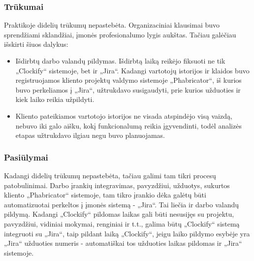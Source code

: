 \subsubsection{Trūkumai}
Praktikoje didelių trūkumų nepastebėta. Organizaciniai klausimai buvo sprendžiami sklandžiai, įmonės profesionalumo lygis aukštas. Tačiau galėčiau išskirti šiuos dalykus:

\begin{itemize}
    \item Išdirbtų darbo valandų pildymas. Išdirbtą laiką reikėjo fiksuoti ne tik „Clockify“ sistemoje, bet ir „Jira“. Kadangi vartotojų istorijos ir klaidos buvo registruojamos
    kliento projektų valdymo sistemoje „Phabricator“, iš kurios buvo perkeliamos į „Jira“, užtrukdavo susigaudyti, prie kurios užduoties ir kiek laiko reikia užpildyti.
    \item Kliento pateikiamos vartotojo istorijos ne visada atspindėjo visą vaizdą, nebuvo iki galo aišku, kokį funkcionalumą reikia įgyvendinti, todėl analizės etapas užtrukdavo ilgiau
    negu buvo planuojamas.
\end{itemize}


\subsubsection{Pasiūlymai}
Kadangi didelių trūkumų nepastebėta, tačiau galimi tam tikri procesų patobulinimai. Darbo įrankių integravimas, pavyzdžiui, užduotys, sukurtos kliento „Phabricator“ sistemoje,
tam tikro įrankio dėka galėtų būti automatizuotai perkeltos į įmonės sistemą - „Jira“. Tai liečia ir darbo valandų pildymą. Kadangi „Clockify“ pildomas laikas
gali būti nesusijęs su projektu, pavyzdžiui, vidiniai mokymai, renginiai ir t.t., galima būtų „Clockify“ sistemą integruoti su „Jira“, taip pildant laiką „Clockify“,
jeigu laiko pildymo esybėje yra „Jira“ užduoties numeris - automatiškai tos užduoties laikas pildomas ir „Jira“ sistemoje.